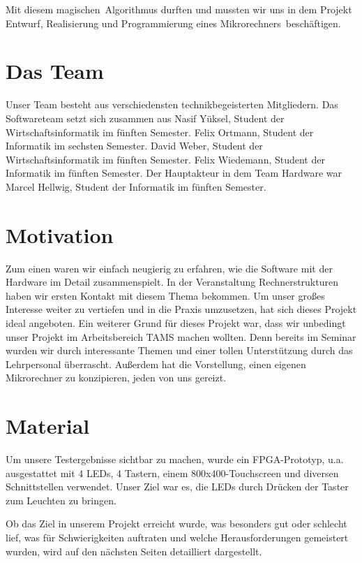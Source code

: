Mit diesem \glqq magischen\grqq \ Algorithmus durften und mussten wir uns in dem Projekt \glqq Entwurf, Realisierung und Programmierung eines Mikrorechners\grqq \ beschäftigen. 

\section{Das Team}
Unser Team besteht aus verschiedensten technikbegeisterten Mitgliedern. Das Softwareteam setzt sich zusammen aus Nasif Yüksel, Student der Wirtschaftsinformatik im fünften Semester.  Felix Ortmann, Student der Informatik im sechsten Semester. David Weber, Student der Wirtschaftsinformatik im fünften Semester. Felix Wiedemann, Student der Informatik im fünften Semester. Der Hauptakteur in dem Team Hardware war Marcel Hellwig, Student der Informatik im fünften Semester.

\section{Motivation}
Zum einen waren wir einfach neugierig zu erfahren, wie die Software mit der Hardware im Detail zusammenspielt. In der Veranstaltung Rechnerstrukturen haben wir ersten Kontakt mit diesem Thema bekommen. Um unser großes Interesse weiter zu vertiefen und in die Praxis umzusetzen, hat sich dieses Projekt ideal angeboten.
Ein weiterer Grund für dieses Projekt war, dass wir unbedingt unser Projekt im Arbeitsbereich TAMS machen wollten. Denn bereits im Seminar wurden wir durch interessante Themen und einer tollen Unterstützung durch das Lehrpersonal überrascht.
Außerdem hat die Vorstellung, einen eigenen Mikrorechner zu konzipieren, jeden von uns gereizt.

\section{Material}
Um unsere Testergebnisse sichtbar zu machen, wurde ein FPGA-Prototyp, u.a. ausgestattet mit 4 LEDs, 4 Tastern, einem 800x400-Touchscreen und diversen Schnittstellen verwendet. Unser Ziel war es, die LEDs durch Drücken der Taster zum Leuchten zu bringen.

Ob das Ziel in unserem Projekt erreicht wurde, was besonders gut oder schlecht lief, was für Schwierigkeiten auftraten und welche Herausforderungen gemeistert wurden, wird auf den nächsten Seiten detailliert dargestellt. 
